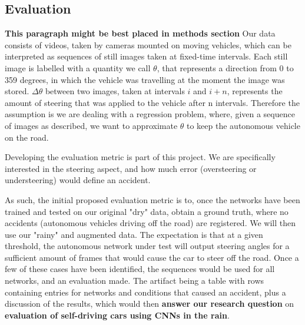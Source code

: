 
\subsection{Evaluation}

\textbf{This paragraph might be best placed in methods section} Our data consists of videos, taken by cameras mounted on moving vehicles, which can be interpreted as sequences of still images taken at fixed-time intervals. Each still image is labelled with a quantity we call $\theta$, that represents a direction from 0 to 359 degrees, in which the vehicle was travelling at the moment the image was stored. $\Delta \theta$ between two images, taken at intervals $i$ and $i+n$, represents the amount of steering that was applied to the vehicle after n intervals. Therefore the assumption is we are dealing with a regression problem, where, given a sequence of images as described, we want to approximate $\theta$ to keep the autonomous vehicle on the road.


Developing the evaluation metric is part of this project. We are specifically interested in the steering aspect, and how much error (oversteering or understeering) would define an accident.

As such, the initial proposed evaluation metric is to, once the networks have been trained and tested on our original "dry" data, obtain a ground truth, where no accidents (autonomous vehicles driving off the road) are registered. We will then use our "rainy" and augmented data. The expectation is that at a given threshold, the autonomous network under test will output steering angles for a sufficient amount of frames that would cause the car to steer off the road.
Once a few of these cases have been identified, the sequences would be used for all networks, and an evaluation made. The artifact being a table with rows containing entries for networks and conditions that caused an accident, plus a discussion of the results, which would then \textbf{answer our research question} on \textbf{evaluation of self-driving cars using CNNs in the rain}. 